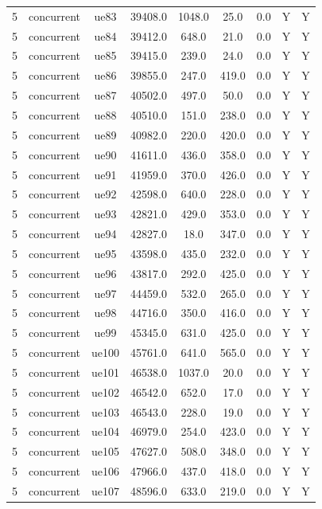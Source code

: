 \begin{table}[ht]
\begin{tabular}{|c|c|c|c|c|c|c|c|c|}
5 & concurrent & ue83 & 39408.0 & 1048.0 & 25.0 & 0.0 & Y & Y \\
5 & concurrent & ue84 & 39412.0 & 648.0 & 21.0 & 0.0 & Y & Y \\
5 & concurrent & ue85 & 39415.0 & 239.0 & 24.0 & 0.0 & Y & Y \\
5 & concurrent & ue86 & 39855.0 & 247.0 & 419.0 & 0.0 & Y & Y \\
5 & concurrent & ue87 & 40502.0 & 497.0 & 50.0 & 0.0 & Y & Y \\
5 & concurrent & ue88 & 40510.0 & 151.0 & 238.0 & 0.0 & Y & Y \\
5 & concurrent & ue89 & 40982.0 & 220.0 & 420.0 & 0.0 & Y & Y \\
5 & concurrent & ue90 & 41611.0 & 436.0 & 358.0 & 0.0 & Y & Y \\
5 & concurrent & ue91 & 41959.0 & 370.0 & 426.0 & 0.0 & Y & Y \\
5 & concurrent & ue92 & 42598.0 & 640.0 & 228.0 & 0.0 & Y & Y \\
5 & concurrent & ue93 & 42821.0 & 429.0 & 353.0 & 0.0 & Y & Y \\
5 & concurrent & ue94 & 42827.0 & 18.0 & 347.0 & 0.0 & Y & Y \\
5 & concurrent & ue95 & 43598.0 & 435.0 & 232.0 & 0.0 & Y & Y \\
5 & concurrent & ue96 & 43817.0 & 292.0 & 425.0 & 0.0 & Y & Y \\
5 & concurrent & ue97 & 44459.0 & 532.0 & 265.0 & 0.0 & Y & Y \\
5 & concurrent & ue98 & 44716.0 & 350.0 & 416.0 & 0.0 & Y & Y \\
5 & concurrent & ue99 & 45345.0 & 631.0 & 425.0 & 0.0 & Y & Y \\
5 & concurrent & ue100 & 45761.0 & 641.0 & 565.0 & 0.0 & Y & Y \\
5 & concurrent & ue101 & 46538.0 & 1037.0 & 20.0 & 0.0 & Y & Y \\
5 & concurrent & ue102 & 46542.0 & 652.0 & 17.0 & 0.0 & Y & Y \\
5 & concurrent & ue103 & 46543.0 & 228.0 & 19.0 & 0.0 & Y & Y \\
5 & concurrent & ue104 & 46979.0 & 254.0 & 423.0 & 0.0 & Y & Y \\
5 & concurrent & ue105 & 47627.0 & 508.0 & 348.0 & 0.0 & Y & Y \\
5 & concurrent & ue106 & 47966.0 & 437.0 & 418.0 & 0.0 & Y & Y \\
5 & concurrent & ue107 & 48596.0 & 633.0 & 219.0 & 0.0 & Y & Y \\

\end{tabular}
\end{table}
